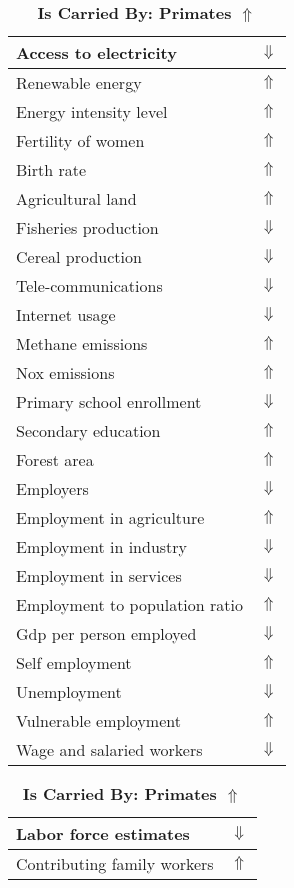\documentclass[12pt,notitlepage,oneside]{report}
\begin{document}
\begin{table}[!htb]
\caption{\textbf{Is Carried By: Primates $\Uparrow$}}
\centering
\label{Correlated Socio-economic Factors0}
\begin{tabular}{|l|l|}
\hline
Access to electricity & $\Downarrow$\\ \hline
Renewable energy & $\Uparrow$\\ \hline
Energy intensity level & $\Uparrow$\\ \hline
Fertility of women & $\Uparrow$\\ \hline
Birth rate & $\Uparrow$\\ \hline
Agricultural land & $\Uparrow$\\ \hline
Fisheries production & $\Downarrow$\\ \hline
Cereal production & $\Downarrow$\\ \hline
Tele-communications & $\Downarrow$\\ \hline
Internet usage & $\Downarrow$\\ \hline
Methane emissions & $\Uparrow$\\ \hline
Nox emissions & $\Uparrow$\\ \hline
Primary school enrollment & $\Downarrow$\\ \hline
Secondary education & $\Uparrow$\\ \hline
Forest area & $\Uparrow$\\ \hline
Employers & $\Downarrow$\\ \hline
Employment in agriculture & $\Uparrow$\\ \hline
Employment in industry & $\Downarrow$\\ \hline
Employment in services & $\Downarrow$\\ \hline
Employment to population ratio & $\Uparrow$\\ \hline
Gdp per person employed & $\Downarrow$\\ \hline
Self employment & $\Uparrow$\\ \hline
Unemployment & $\Downarrow$\\ \hline
Vulnerable employment & $\Uparrow$\\ \hline
Wage and salaried workers & $\Downarrow$\\ \hline
\end{tabular}
\begin{tabular}{|l|l|}
\hline
Labor force estimates & $\Downarrow$\\ \hline
Contributing family workers & $\Uparrow$\\ \hline

\end{tabular}
\end{table}
\end{document}
